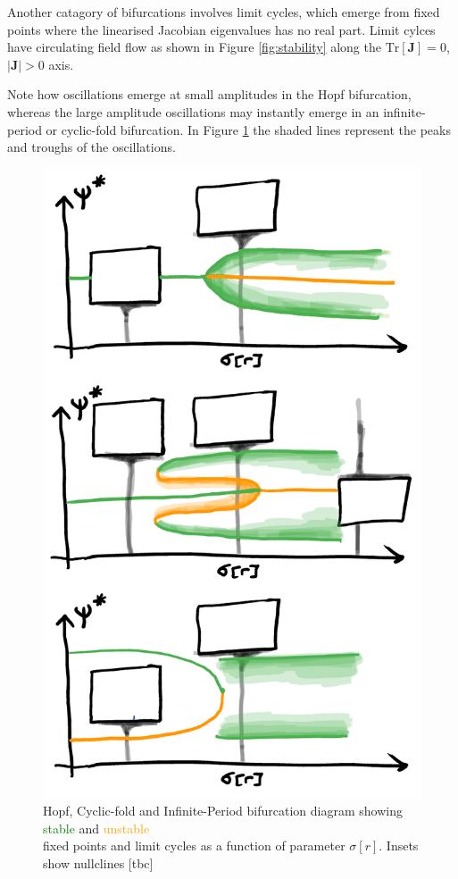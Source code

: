 \documentclass{article}[12pt]
\numberwithin{equation}{section}
\begin{document}
Another catagory of bifurcations involves limit cycles, which emerge from fixed
points where the linearised Jacobian eigenvalues has no real part. Limit cylces
have circulating field flow as shown in Figure \ref{fig:stability} along the
$\mathrm{Tr}[\mathbf{J}]=0$, $|\mathbf{J}|>0$ axis.

Note how oscillations emerge at small amplitudes in the Hopf bifurcation,
whereas the large amplitude oscillations may instantly emerge in an infinite-period
or cyclic-fold bifurcation. In Figure \ref{fig:limitcycles} the shaded lines
represent the peaks and troughs of the oscillations.
\begin{figure}[H]
\centering{}
\captionsetup{justification=centering}
\includegraphics[scale=0.35]{figures/limitcycles}
\caption{Hopf, Cyclic-fold and Infinite-Period bifurcation diagram showing
\textcolor{Green}{stable} and \textcolor{orange}{unstable}\\ fixed points
and limit cycles as a function of parameter $\sigma[r]$.
Insets show nullclines [tbc]}
\label{fig:limitcycles}
\end{figure}
\end{document}
